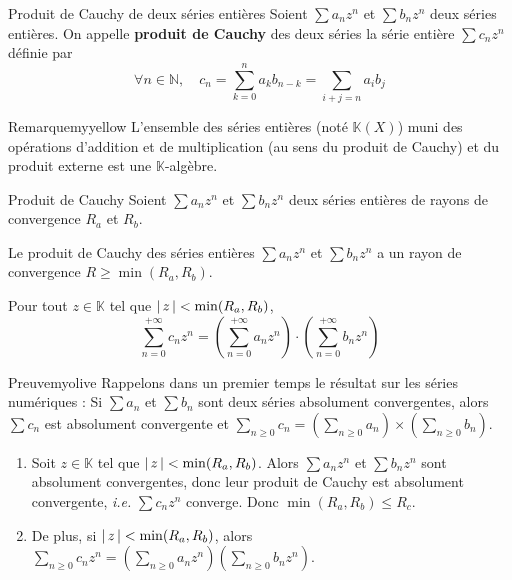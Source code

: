     \begin{defi}{Produit de Cauchy de deux séries entières}{}
        Soient $\sum a_n z^n$ et $\sum b_n z^n$ deux séries entières. On appelle \textbf{produit de Cauchy} des deux séries la série entière $\sum c_n z^n$ définie par 
        \[ \forall n \in \mathbb{N}, \quad c_n = \sum_{k=0}^{n} a_k b_{n-k} = \sum_{i + j = n} a_i b_j \]
    \end{defi}

    \begin{omed}{Remarque}{myyellow}
        L’ensemble des séries entières (noté $\mathbb{K}(X)$) muni des opérations d’addition et de multiplication (au sens du produit de Cauchy) et du produit externe est une $\mathbb{K}$-algèbre.
    \end{omed}

    \begin{prop}{Produit de Cauchy}{}
        Soient $\sum a_n z^n$ et $\sum b_n z^n$ deux séries entières de rayons de convergence $R_a$ et $R_b$.
        \begin{alors}
            \item Le produit de Cauchy des  séries entières $\sum a_n z^n$ et $\sum b_n z^n$ a un rayon de convergence $R \geq \min(R_a,R_b)$.
            \item Pour tout $z \in \mathbb{K}$ tel que $\left\lvert \,z \, \right\rvert < \min(R_a, R_b)$, 
            \[ \sum_{n=0}^{+\infty} c_n z^n = \left(\sum_{n=0}^{+\infty} a_n z^n\right) \cdotp \left(\sum_{n=0}^{+\infty} b_n z^n\right) \]
        \end{alors}
    \end{prop}

    \begin{demo}{Preuve}{myolive}
        Rappelons dans un premier temps le résultat sur les séries numériques : Si $\sum a_n$ et $\sum b_n$ sont deux séries absolument convergentes, alors $\sum c_n$ est absolument convergente et $\sum_{n \geq 0} c_n = \left(\sum_{n \geq 0} a_n\right)\times\left(\sum_{n \geq 0} b_n\right)$.
        \begin{enumerate}
            \item Soit $z \in \mathbb{K}$ tel que $\left\lvert \,z \, \right\rvert < \min(R_a,R_b)$. Alors $\sum a_n z^n$ et $\sum b_n z^n$ sont absolument convergentes, donc leur produit de Cauchy est absolument convergente, \textit{i.e.} $\sum c_n z^n$ converge. Donc $\min(R_a, R_b) \leq R_c$.
            \item De plus, si $\left\lvert \,z \, \right\rvert < \min(R_a,R_b)$, alors $\sum_{n \geq 0} c_n z^n = \left(\sum_{n \geq 0} a_n z^n\right)\left(\sum_{n \geq 0} b_n z^n\right)$.
        \end{enumerate}
    \end{demo}

